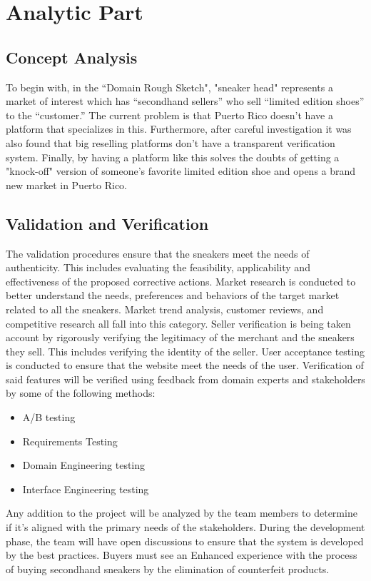 \chapter{Analytic Part}
\section{Concept Analysis}
\hspace{1cm} To begin with, in the “Domain Rough Sketch", 
"sneaker head" represents a market of interest which has “secondhand sellers” who sell “limited edition shoes” to the “customer.” 
The current problem is that Puerto Rico doesn't have a platform that specializes in this. Furthermore, after careful investigation it was also found that big reselling platforms don't have a transparent verification system. Finally, by having a platform like this solves the doubts of getting a "knock-off" version of someone's favorite limited edition shoe and opens a brand new market in Puerto Rico.
\section{Validation and Verification}
\hspace{1cm} The validation procedures ensure that the sneakers meet the needs of authenticity. This includes evaluating the feasibility, applicability and effectiveness of the proposed corrective actions.
Market research is conducted to better understand the needs, preferences and behaviors of the target market related to all the sneakers. Market trend analysis, customer reviews, and competitive research all fall into this category.
Seller verification is being taken account by rigorously verifying the legitimacy of the merchant and the sneakers they sell. This includes verifying the identity of the seller.
User acceptance testing is conducted to ensure that the website meet the needs of the user. Verification of said features will be verified using feedback from domain experts and stakeholders by some of the following methods:
\begin{itemize}
  \item A/B testing
  \item Requirements Testing
  \item Domain Engineering testing
  \item Interface Engineering testing
\end{itemize}
Any addition to the project will be analyzed by the team members to determine if it’s aligned with the primary needs of the stakeholders. During the development phase, the team will have open discussions to ensure that the system is developed by the best practices. Buyers must see an Enhanced experience with the process of buying secondhand sneakers by the elimination of counterfeit products.
